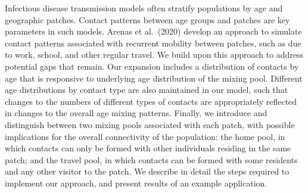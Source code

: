 Infectious disease transmission models often stratify populations by age and geographic patches.
Contact patterns between age groups and patches are key parameters in such models.
Arenas et al.\ (2020) develop an approach to simulate contact patterns associated with
recurrent mobility between patches, such as due to work, school, and other regular travel.
We build upon this approach to address potential gaps that remain.
Our expansion includes a distribution of contacts by age
that is responsive to underlying age distribution of the mixing pool.
Different age distributions by contact type are also maintained in our model,
such that changes to the numbers of different types of contacts
are appropriately reflected in changes to the overall age mixing patterns.
Finally, we introduce and distinguish between two mixing pools associated with each patch,
with possible implications for the overall connectivity of the population:
the home pool, in which contacts can only be formed with other individuals residing in the same patch;
and the travel pool, in which contacts can be formed with some residents and any other visitor to the patch.
We describe in detail the steps required to implement our approach,
and present results of an example application.

